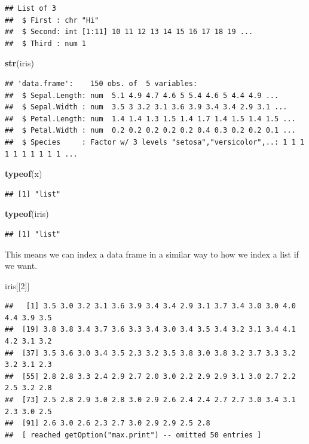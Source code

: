 \documentclass[
]{book}
\newenvironment{Shaded}{\begin{snugshade}}{\end{snugshade}}
\newcommand{\DecValTok}[1]{\textcolor[rgb]{0.00,0.00,0.81}{#1}}
\newcommand{\KeywordTok}[1]{\textcolor[rgb]{0.13,0.29,0.53}{\textbf{#1}}}
\newcommand{\NormalTok}[1]{#1}
\theoremstyle{definition}
\theoremstyle{definition}
\theoremstyle{definition}
\theoremstyle{remark}
\begin{document}
\begin{verbatim}
## List of 3
##  $ First : chr "Hi"
##  $ Second: int [1:11] 10 11 12 13 14 15 16 17 18 19 ...
##  $ Third : num 1
\end{verbatim}

\begin{Shaded}
\begin{Highlighting}[]
\KeywordTok{str}\NormalTok{(iris)}
\end{Highlighting}
\end{Shaded}

\begin{verbatim}
## 'data.frame':    150 obs. of  5 variables:
##  $ Sepal.Length: num  5.1 4.9 4.7 4.6 5 5.4 4.6 5 4.4 4.9 ...
##  $ Sepal.Width : num  3.5 3 3.2 3.1 3.6 3.9 3.4 3.4 2.9 3.1 ...
##  $ Petal.Length: num  1.4 1.4 1.3 1.5 1.4 1.7 1.4 1.5 1.4 1.5 ...
##  $ Petal.Width : num  0.2 0.2 0.2 0.2 0.2 0.4 0.3 0.2 0.2 0.1 ...
##  $ Species     : Factor w/ 3 levels "setosa","versicolor",..: 1 1 1 1 1 1 1 1 1 1 ...
\end{verbatim}

\begin{Shaded}
\begin{Highlighting}[]
\KeywordTok{typeof}\NormalTok{(x)}
\end{Highlighting}
\end{Shaded}

\begin{verbatim}
## [1] "list"
\end{verbatim}

\begin{Shaded}
\begin{Highlighting}[]
\KeywordTok{typeof}\NormalTok{(iris)}
\end{Highlighting}
\end{Shaded}

\begin{verbatim}
## [1] "list"
\end{verbatim}

This means we can index a data frame in a similar way to how we index a list if we want.

\begin{Shaded}
\begin{Highlighting}[]
\NormalTok{iris[[}\DecValTok{2}\NormalTok{]]}
\end{Highlighting}
\end{Shaded}

\begin{verbatim}
##   [1] 3.5 3.0 3.2 3.1 3.6 3.9 3.4 3.4 2.9 3.1 3.7 3.4 3.0 3.0 4.0 4.4 3.9 3.5
##  [19] 3.8 3.8 3.4 3.7 3.6 3.3 3.4 3.0 3.4 3.5 3.4 3.2 3.1 3.4 4.1 4.2 3.1 3.2
##  [37] 3.5 3.6 3.0 3.4 3.5 2.3 3.2 3.5 3.8 3.0 3.8 3.2 3.7 3.3 3.2 3.2 3.1 2.3
##  [55] 2.8 2.8 3.3 2.4 2.9 2.7 2.0 3.0 2.2 2.9 2.9 3.1 3.0 2.7 2.2 2.5 3.2 2.8
##  [73] 2.5 2.8 2.9 3.0 2.8 3.0 2.9 2.6 2.4 2.4 2.7 2.7 3.0 3.4 3.1 2.3 3.0 2.5
##  [91] 2.6 3.0 2.6 2.3 2.7 3.0 2.9 2.9 2.5 2.8
##  [ reached getOption("max.print") -- omitted 50 entries ]
\end{verbatim}
\end{document}
